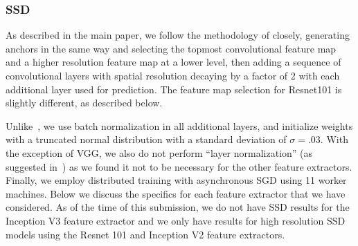 \documentclass[10pt,twocolumn,letterpaper]{article}
\begin{document}
\subsubsection{SSD}
As described in the main paper, we follow
the methodology of \cite{liu2015ssd} closely, 
generating anchors in the same way and
selecting the topmost convolutional feature map and a 
higher resolution feature map at a lower level, then adding a sequence of 
convolutional layers with spatial resolution decaying by a factor of 2
with each additional layer used for prediction. The feature map selection for Resnet101 is slightly different, as described below.

Unlike~\cite{liu2015ssd}, we use batch normalization in all additional layers, and 
initialize weights with a truncated normal distribution with a standard deviation of $\sigma=.03$.
With the exception of VGG, we also do not perform ``layer normalization'' (as suggested in~\cite{liu2015ssd}) as we found it not to be necessary for the other feature extractors.
Finally, we employ distributed training with asynchronous SGD using 11 worker machines.
Below we discuss the specifics for each feature extractor that we have considered.
As of the time of this submission, we do not have SSD results for the Inception V3
feature extractor and we only have results for high resolution SSD models 
using the Resnet 101 and Inception V2 feature extractors.
\end{document}
